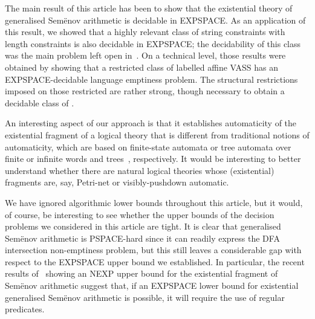 
The main result of this article has been to show that the existential
theory of generalised Sem{\"e}nov arithmetic is decidable in
EXPSPACE. As an application of this result, we showed that a highly
relevant class of string constraints with length constraints is also
decidable in EXPSPACE; the decidability of this class was the main
problem left open in~\cite{BDGKMMN23}. On a technical level, those
results were obtained by showing that a restricted class of labelled
affine VASS has an EXPSPACE-decidable language emptiness problem. The
structural restrictions imposed on those restricted \laVASS are rather
strong, though necessary to obtain a decidable class of \laVASS.

An interesting aspect of our approach is that it establishes
automaticity of the existential fragment of a logical theory that is
different from traditional notions of automaticity, which are based on
finite-state automata or tree automata over finite or infinite words
and trees~\cite{KN95,BG00}, respectively. It would be interesting to
better understand whether there are natural logical theories whose
(existential) fragments are, say, Petri-net or visibly-pushdown
automatic.

We have ignored algorithmic lower bounds throughout this article, but
it would, of course, be interesting to see whether the upper bounds of
the decision problems we considered in this article are tight. It is
clear that generalised Sem{\"e}nov arithmetic is PSPACE-hard since it
can readily express the DFA intersection non-emptiness problem, but
this still leaves a considerable gap with respect to the EXPSPACE
upper bound we established. In particular, the recent results
of~\cite{BCM23} showing an NEXP upper bound for the existential
fragment of Sem{\"e}nov arithmetic suggest that, if an EXPSPACE lower
bound for existential generalised Sem{\"e}nov arithmetic is possible,
it will require the use of regular predicates.
